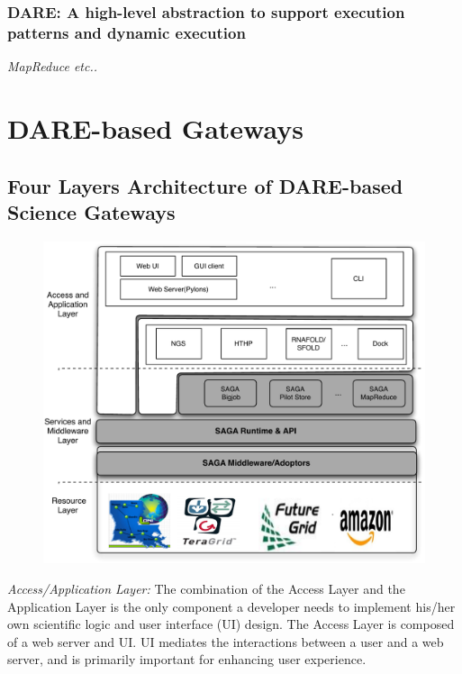 \documentclass[]{article}
\begin{document}
\subsubsection{DARE: A high-level abstraction to support execution
  patterns and dynamic execution} 

{\it MapReduce etc..}

\section{DARE-based Gateways}

\subsection{Four Layers Architecture of DARE-based Science
  Gateways}

\begin{figure}
  \centering
  \includegraphics[scale=0.40]{figures/DAREOutline.pdf}
  \caption{\small {}}
  \label{fig:dare-arch} 
\end{figure}

\textit{Access/Application Layer:} The combination of the Access Layer
and the Application Layer is the only component a developer needs to
implement his/her own scientific logic and user interface (UI) design.
The Access Layer is composed of a web server and UI.  UI mediates the
interactions between a user and a web server, and is primarily
important for enhancing user experience.
\end{document}
